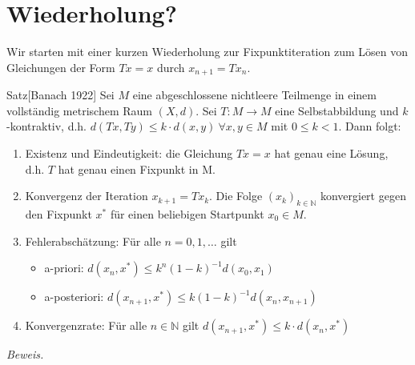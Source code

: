 \documentclass{article}
\begin{document}
\section{Wiederholung?}
Wir starten mit einer kurzen Wiederholung zur Fixpunktiteration zum Lösen von Gleichungen 
der Form $Tx=x$ durch $x_{n+1}=Tx_n$.

\begin{thmbox}{Satz}[Banach 1922]
    Sei $M$ eine abgeschlossene nichtleere Teilmenge in einem vollständig metrischem Raum $(X,d)$. 
    Sei $T:M\rightarrow M$ eine Selbstabbildung und $k$-kontraktiv, d.h. $d(Tx,Ty)\leq k\cdot d(x,y)\ \forall x,y\in M$ 
    mit $0\leq k < 1$. Dann folgt:
    \begin{enumerate}
        \item Existenz und Eindeutigkeit: die Gleichung $Tx=x$ hat genau eine Lösung, d.h. $T$ hat genau einen 
        Fixpunkt in M.
        \item Konvergenz der Iteration $x_{k+1}=Tx_k$. Die Folge $(x_k)_{k\in\mathbb{N}}$ konvergiert gegen den 
        Fixpunkt $x^*$ für einen beliebigen Startpunkt $x_0\in M$.
        \item Fehlerabschätzung: Für alle $n=0,1,\dotsc$ gilt 
        \begin{itemize}
            \item a-priori: $d(x_n,x^*)\leq k^n(1-k)^{-1}d(x_0,x_1)$
            \item a-posteriori: $d(x_{n+1},x^*)\leq k(1-k)^{-1}d(x_n,x_{n+1})$
        \end{itemize}
        \item Konvergenzrate: Für alle $n\in\mathbb{N}$ gilt $d(x_{n+1},x^*)\leq k\cdot d(x_n,x^*)$
    \end{enumerate}
\end{thmbox}
\textit{Beweis.} 
\end{document}
